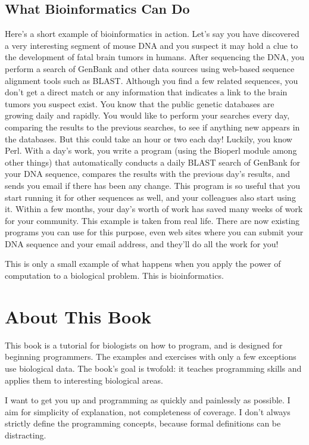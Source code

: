 \subsection*{What Bioinformatics Can Do}
Here's a short example of bioinformatics in action. Let's say you have discovered a very interesting segment of mouse DNA and you suspect it may hold a clue to the development of fatal brain tumors in humans. After sequencing the DNA, you perform a search of GenBank and other data sources using web-based sequence alignment tools such as BLAST. Although you find a few related sequences, you don't get a direct match or any information that indicates a link to the brain tumors you suspect exist. You know that the public genetic databases are growing daily and rapidly. You would like to perform your searches every day, comparing the results to the previous searches, to see if anything new appears in the databases. But this could take an hour or two each day! Luckily, you know Perl. With a day's work, you write a program (using the Bioperl module among other things) that automatically conducts a daily BLAST search of GenBank for your DNA sequence, compares the results with the previous day's results, and sends you email if there has been any change. This program is so useful that you start running it for other sequences as well, and your colleagues also start using it. Within a few months, your day's worth of work has saved many weeks of work for your community. This example is taken from real life. There are now existing programs you can use for this purpose, even web sites where you can submit your DNA sequence and your email address, and they'll do all the work for you!

This is only a small example of what happens when you apply the power of computation to a biological problem. This is bioinformatics.

\section*{About This Book}
This book is a tutorial for biologists on how to program, and is designed for beginning programmers. The examples and exercises with only a few exceptions use biological data. The book's goal is twofold: it teaches programming skills and applies them to interesting biological areas.

I want to get you up and programming as quickly and painlessly as possible. I aim for simplicity of explanation, not completeness of coverage. I don't always strictly define the programming concepts, because formal definitions can be distracting.

